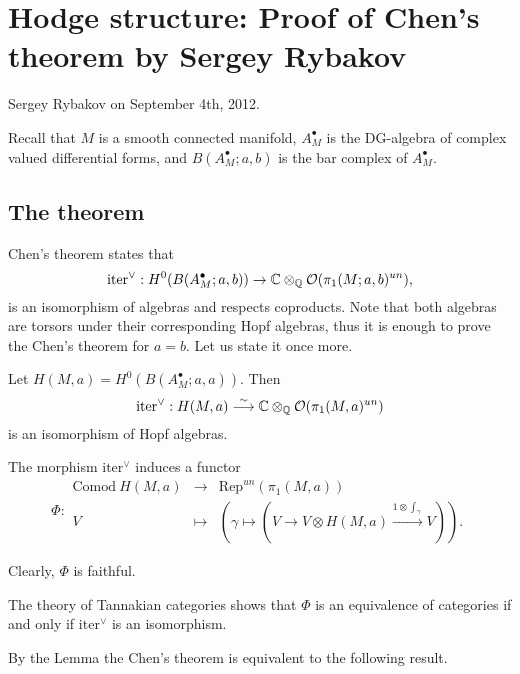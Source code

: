 \chapter{Hodge structure: Proof of Chen's theorem by Sergey Rybakov}

Sergey Rybakov on September 4th, 2012.

\medskip
\medskip

\noindent Recall that $M$ is a smooth connected manifold, $A_M^\bullet$ is the DG-algebra of complex valued differential forms, and $B(A_M^\bullet;a,b)$ is the bar complex of $A_M^\bullet$.

\section{The theorem}

Chen's theorem states that
\[
\mathrm{iter}^{\vee} : H^0(B(A_M^\bullet;a,b)) \to \mathbb{C} \otimes_{\mathbb{Q}} \mathcal{O}(\pi_1(M;a,b)^{un}),
\]
is an isomorphism of algebras and respects coproducts. 
Note that both algebras are torsors under their corresponding Hopf algebras, thus it is enough to prove the Chen's theorem for $a=b$. Let us state it once more.

\begin{thm}\label{thm:chentwo}
Let $H(M,a) = H^0(B(A_M^\bullet;a,a))$. Then
\[
\mathrm{iter}^{\vee} : H(M,a) \stackrel{\sim}{\longrightarrow} \mathbb{C} \otimes_{\mathbb{Q}} \mathcal{O}(\pi_1(M,a)^{un})
\]
is an isomorphism of Hopf algebras.
\end{thm}

The morphism $\mathrm{iter}^{\vee}$ induces a functor
\[
\Phi : \begin{array}{rcl}
\mathrm{Comod~} H(M,a) & \longrightarrow & \mathrm{Rep}^{un}(\pi_1(M,a)) \\
V & \mapsto & \left( \gamma \mapsto \left( V \to V \otimes H(M,a) \stackrel{1 \otimes \int_{\gamma}}{\longrightarrow} V \right) \right).
\end{array}
\]

Clearly, $\Phi$ is faithful. 

\begin{lemma}
The theory of Tannakian categories shows that $\Phi$ is an equivalence of categories if and only if $\mathrm{iter}^{\vee}$ is an isomorphism.
\end{lemma}

By the Lemma the Chen's theorem is equivalent to the following result.

